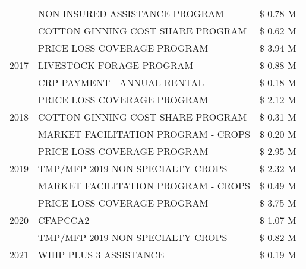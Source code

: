 \begin{tabular}{llr}
 & NON-INSURED ASSISTANCE PROGRAM                & \$ 0.78 M \\
 & COTTON GINNING COST SHARE PROGRAM             & \$ 0.62 M \\
\cline{1-3}
\multirow[t]{3}{*}{2017} & PRICE LOSS COVERAGE PROGRAM & \$ 3.94 M \\
 & LIVESTOCK FORAGE PROGRAM & \$ 0.88 M \\
 & CRP PAYMENT - ANNUAL RENTAL & \$ 0.18 M \\
\cline{1-3}
\multirow[t]{3}{*}{2018} & PRICE LOSS COVERAGE PROGRAM & \$ 2.12 M \\
 & COTTON GINNING COST SHARE PROGRAM & \$ 0.31 M \\
 & MARKET FACILITATION PROGRAM - CROPS & \$ 0.20 M \\
\cline{1-3}
\multirow[t]{3}{*}{2019} & PRICE LOSS COVERAGE PROGRAM & \$ 2.95 M \\
 & TMP/MFP 2019 NON SPECIALTY CROPS & \$ 2.32 M \\
 & MARKET FACILITATION PROGRAM - CROPS & \$ 0.49 M \\
\cline{1-3}
\multirow[t]{3}{*}{2020} & PRICE LOSS COVERAGE PROGRAM & \$ 3.75 M \\
 & CFAPCCA2 & \$ 1.07 M \\
 & TMP/MFP 2019 NON SPECIALTY CROPS & \$ 0.82 M \\
\cline{1-3}
2021 & WHIP PLUS 3 ASSISTANCE & \$ 0.19 M \\
\cline{1-3}
\bottomrule
\end{tabular}
